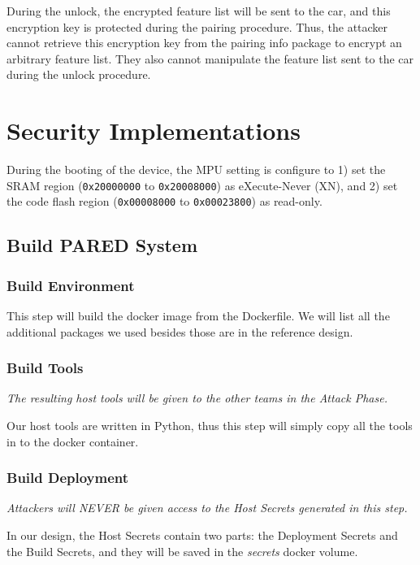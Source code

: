 \documentclass[11pt,oneside,onecolumn,letterpaper]{article}
\begin{document}
During the unlock, the encrypted feature list will be sent to the car, and this encryption key is protected during the pairing procedure.
Thus, the attacker cannot retrieve this encryption key from the pairing info package to encrypt an arbitrary feature list.
They also cannot manipulate the feature list sent to the car during the unlock procedure.


\section{Security Implementations}

During the booting of the device, the MPU setting is configure to 1) set the SRAM region (\verb|0x20000000| to \verb|0x20008000|) as eXecute-Never (XN), and 2) set the code flash region (\verb|0x00008000| to \verb|0x00023800|) as read-only.

\subsection{Build PARED System}

\subsubsection{Build Environment}

This step will build the docker image from the Dockerfile. We will list all the additional packages we used besides those are in the reference design.

\subsubsection{Build Tools}

\textit{The resulting host tools will be given to the other teams in the Attack Phase.}

Our host tools are written in Python, thus this step will simply copy all the tools in to the docker container.

\subsubsection{Build Deployment}

\textit{Attackers will NEVER be given access to the Host Secrets generated in this step.}

In our design, the Host Secrets contain two parts: the Deployment Secrets and the Build Secrets, and they will be saved in the \textit{secrets} docker volume.
\end{document}

